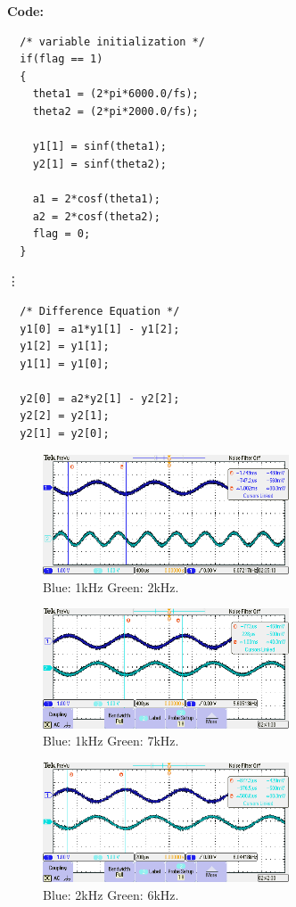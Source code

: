 \documentclass{article}
\begin{document}
\textbf{Code:}

\begin{verbatim}
  /* variable initialization */
  if(flag == 1)
  {
    theta1 = (2*pi*6000.0/fs);
    theta2 = (2*pi*2000.0/fs);

    y1[1] = sinf(theta1);
    y2[1] = sinf(theta2);

    a1 = 2*cosf(theta1);
    a2 = 2*cosf(theta2);
    flag = 0;
  }
\end{verbatim}

\vdots

\begin{verbatim}
  /* Difference Equation */
  y1[0] = a1*y1[1] - y1[2];
  y1[2] = y1[1];
  y1[1] = y1[0];

  y2[0] = a2*y2[1] - y2[2];
  y2[2] = y2[1];
  y2[1] = y2[0];
\end{verbatim}

\begin{figure}[h]
  \begin{center}
    \includegraphics[width=0.65\textwidth]{img/task1.PNG}
    \caption{Blue: 1kHz Green: 2kHz.}
  \end{center}
\end{figure}

\begin{figure}[h]
  \begin{center}
    \includegraphics[width=0.65\textwidth]{img/task2.PNG}
    \caption{Blue: 1kHz Green: 7kHz.}
  \end{center}
\end{figure}

\begin{figure}[h]
  \begin{center}
    \includegraphics[width=0.65\textwidth]{img/task3.PNG}
    \caption{Blue: 2kHz Green: 6kHz.}
  \end{center}
\end{figure}
\end{document}
